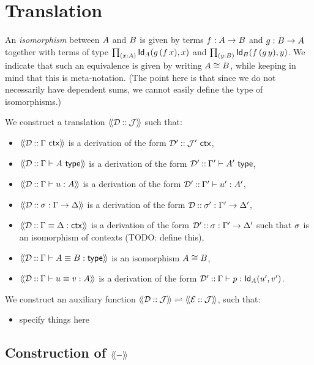
\section{Translation}
\label{sec:translation}

An \emph{isomorphism} between $A$ and $B$ is given by terms $f : A \to B$ and
$g : B \to A$ together with terms of type $\mathop{\textstyle\prod_{(x {:} A)}} \mathsf{Id}_{A}(g \, (f \, x),x)$ and
$\mathop{\textstyle\prod_{(y {:} B)}} \mathsf{Id}_{B}(f \, (g \, y),y)$. We indicate that such an equivalence is given by
writing $A \cong B$, while keeping in mind that this is meta-notation. (The point here
is that since we do not necessarily have dependent sums, we cannot easily define the type
of isomorphisms.)
  
We construct a translation $\langle\!\langle \mathcal{D} \mathbin{{:}{:}} \mathcal{J} \rangle\!\rangle$ such that:
%
\begin{itemize}
\item $\langle\!\langle \mathcal{D} \mathbin{{:}{:}} \Gamma\ \mathsf{ctx} \rangle\!\rangle$ is a derivation of the form $\mathcal{D}' \mathbin{{:}{:}} \mathcal{J}'\ \mathsf{ctx}$,
\item $\langle\!\langle \mathcal{D} \mathbin{{:}{:}} \Gamma \vdash A \ \mathsf{type} \rangle\!\rangle$ is a derivation of the form $\mathcal{D}' \mathbin{{:}{:}} \Gamma' \vdash A' \ \mathsf{type}$,
\item $\langle\!\langle \mathcal{D} \mathbin{{:}{:}} \Gamma \vdash u : A \rangle\!\rangle$ is a derivation of the form $\mathcal{D}' \mathbin{{:}{:}} \Gamma' \vdash u' : A'$,
\item $\langle\!\langle \mathcal{D} \mathbin{{:}{:}} \sigma : \Gamma \to \Delta \rangle\!\rangle$ is a derivation of the form $\mathcal{D} \mathbin{{:}{:}} \sigma' : \Gamma' \to \Delta'$,
\item $\langle\!\langle \mathcal{D} \mathbin{{:}{:}} \Gamma \equiv \Delta : \mathsf{ctx} \rangle\!\rangle$ is a derivation of the form
  $\mathcal{D}' \mathbin{{:}{:}} \sigma : \Gamma' \to \Delta'$ such that $\sigma$ is an isomorphism of
  contexts (TODO: define this),
\item $\langle\!\langle \mathcal{D} \mathbin{{:}{:}} \Gamma \vdash A \equiv B : \mathsf{type} \rangle\!\rangle$ is an isomorphism $A \cong B$,
\item $\langle\!\langle \mathcal{D} \mathbin{{:}{:}} \Gamma \vdash u \equiv v : A \rangle\!\rangle$ is a derivation of the form
  $\mathcal{D}' \mathbin{{:}{:}} \Gamma \vdash p : \mathsf{Id}_{A}(u',v')$.
\end{itemize}
%
We construct an auxiliary function $\langle\!\langle \mathcal{D} \mathbin{{:}{:}} \mathcal{J} \rangle\!\rangle \rightleftharpoons \langle\!\langle \mathcal{E} \mathbin{{:}{:}} \mathcal{J} \rangle\!\rangle$, such that:
%
\begin{itemize}
\item specify things here
\end{itemize}

\subsection{Construction of $\langle\!\langle {-} \rangle\!\rangle$}
\label{sec:construction-tran}

